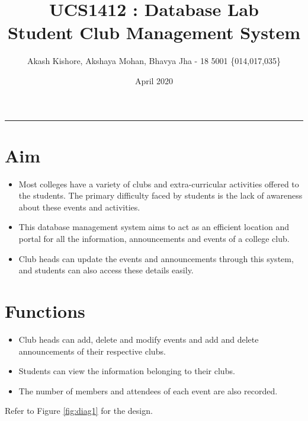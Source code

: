\documentclass[a4paper,10pt]{article}
\author{ \Large Akash Kishore, Akshaya Mohan, Bhavya Jha - 18 5001 \{014,017,035\} }
\date{\Large April 2020}
\title{\Huge \textbf{UCS1412 : Database Lab} \\ \huge \textbf{Student Club Management System}}
\begin{document}
\maketitle
\hrule
\vspace{10pt}

\section*{ \Large Aim}
\large
\begin{itemize}
	\item Most colleges have a variety of clubs and extra-curricular activities offered to the students. The primary difficulty faced by students is the lack of awareness about these events and activities.
	\item This database management system aims to act as an efficient location and portal for all the information, announcements and events of a college club. 
	\item Club heads can update the events and announcements through this system, and students can also access these details easily.
\end{itemize}

\section*{\Large Functions}
\begin{itemize}
	\item Club heads can add, delete and modify events and add and delete announcements of their respective clubs.
	\item Students can view the information belonging to their clubs.
	\item The number of members and attendees of each event are also recorded.
\end{itemize}

\begin{flushleft}Refer to Figure \ref{fig:diag1} for the design.\end{flushleft}
\end{document}
